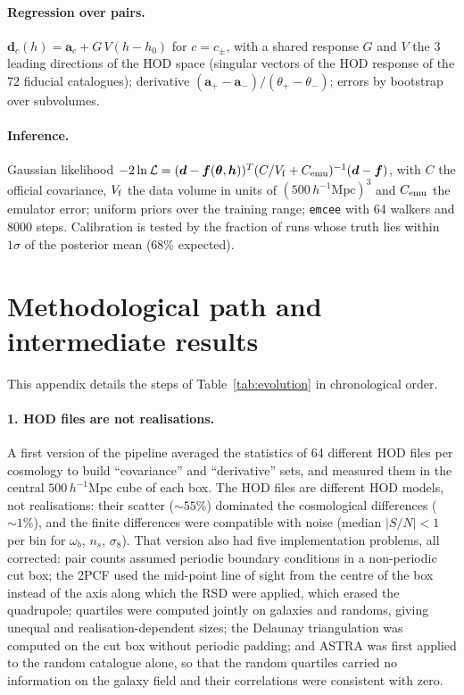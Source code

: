 \documentclass[11pt,twocolumn]{article}
\newcommand{\Mpch}{\,h^{-1}\mathrm{Mpc}}
\begin{document}
\paragraph{Regression over pairs.} $\boldsymbol d_c(h) = \boldsymbol a_c + G\,V(h-h_0)$ for $c=c_\pm$, with a shared response $G$ and $V$ the 3 leading directions of the HOD space (singular vectors of the HOD response of the 72 fiducial catalogues); derivative $(\boldsymbol a_+-\boldsymbol a_-)/(\theta_+-\theta_-)$; errors by bootstrap over subvolumes.

\paragraph{Inference.} Gaussian likelihood $-2\ln\mathcal L = (\boldsymbol d - \boldsymbol f(\boldsymbol\theta,\boldsymbol h))^T (C/V_{\rm f} + C_{\rm emu})^{-1}(\boldsymbol d - \boldsymbol f)$, with $C$ the official covariance, $V_{\rm f}$ the data volume in units of $(500\Mpch)^3$ and $C_{\rm emu}$ the emulator error; uniform priors over the training range; \texttt{emcee} with 64 walkers and 8000 steps. Calibration is tested by the fraction of runs whose truth lies within $1\sigma$ of the posterior mean (68\% expected).

\section{Methodological path and intermediate results}
\label{app:path}

This appendix details the steps of Table~\ref{tab:evolution} in chronological order.

\paragraph{1. HOD files are not realisations.} A first version of the pipeline averaged the statistics of 64 different HOD files per cosmology to build ``covariance'' and ``derivative'' sets, and measured them in the central $500\Mpch$ cube of each box. The HOD files are different HOD models, not realisations: their scatter ($\sim55\%$) dominated the cosmological differences ($\sim1\%$), and the finite differences were compatible with noise (median $|S/N|<1$ per bin for $\omega_b$, $n_s$, $\sigma_8$). That version also had five implementation problems, all corrected: pair counts assumed periodic boundary conditions in a non-periodic cut box; the 2PCF used the mid-point line of sight from the centre of the box instead of the axis along which the RSD were applied, which erased the quadrupole; quartiles were computed jointly on galaxies and randoms, giving unequal and realisation-dependent sizes; the Delaunay triangulation was computed on the cut box without periodic padding; and ASTRA was first applied to the random catalogue alone, so that the random quartiles carried no information on the galaxy field and their correlations were consistent with zero.
\end{document}
